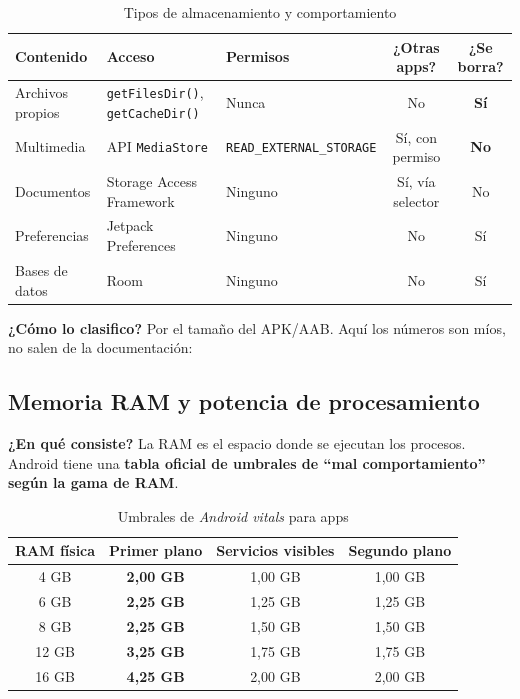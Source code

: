 \documentclass[11pt,a4paper]{article}
\newcommand{\code}[1]{\texttt{\color{ink}#1}}
\newcommand{\campo}[1]{\textbf{\color{ink}#1}}
\begin{document}
	\begin{table}[htbp]
		\centering
		\footnotesize
		\begin{tabularx}{\textwidth}{@{}>{\RaggedRight\arraybackslash}p{2.8cm} >{\RaggedRight\arraybackslash}p{3cm} >{\RaggedRight\arraybackslash}p{3cm} c c@{}}
			\toprule
			\rowcolor{primary}
			\textcolor{paper}{\sffamily\bfseries Contenido} & \textcolor{paper}{\sffamily\bfseries Acceso} & \textcolor{paper}{\sffamily\bfseries Permisos} & \textcolor{paper}{\sffamily\bfseries ¿Otras apps?} & \textcolor{paper}{\sffamily\bfseries ¿Se borra?} \\
			\midrule
			Archivos propios & \code{getFilesDir()}, \code{getCacheDir()} & Nunca & No & \textbf{Sí} \\
			\rowcolor{soft}
			Multimedia & API \code{MediaStore} & \code{READ\_EXTERNAL\_STORAGE} & Sí, con permiso & \textbf{No} \\
			Documentos & Storage Access Framework & Ninguno & Sí, vía selector & No \\
			\rowcolor{soft}
			Preferencias & Jetpack Preferences & Ninguno & No & Sí \\
			Bases de datos & Room & Ninguno & No & Sí \\
			\bottomrule
		\end{tabularx}
		\caption{Tipos de almacenamiento y comportamiento}
	\end{table}
	
	\campo{¿Cómo lo clasifico?} Por el tamaño del APK/AAB. Aquí los números son míos, no salen de la documentación:
	
	\subsection{Memoria RAM y potencia de procesamiento}
	
	\campo{¿En qué consiste?}
	La RAM es el espacio donde se ejecutan los procesos. Android tiene una \textbf{tabla oficial de umbrales de \enquote{mal comportamiento} según la gama de RAM}.
	
	\begin{table}[htbp]
		\centering
		\small
		\begin{tabular}{@{}c c c c@{}}
			\toprule
			\rowcolor{primary}
			\textcolor{paper}{\sffamily\bfseries RAM física} & \textcolor{paper}{\sffamily\bfseries Primer plano} & \textcolor{paper}{\sffamily\bfseries Servicios visibles} & \textcolor{paper}{\sffamily\bfseries Segundo plano} \\
			\midrule
			4 GB & \textbf{2,00 GB} & 1,00 GB & 1,00 GB \\
			\rowcolor{soft}
			6 GB & \textbf{2,25 GB} & 1,25 GB & 1,25 GB \\
			8 GB & \textbf{2,25 GB} & 1,50 GB & 1,50 GB \\
			\rowcolor{soft}
			12 GB & \textbf{3,25 GB} & 1,75 GB & 1,75 GB \\
			16 GB & \textbf{4,25 GB} & 2,00 GB & 2,00 GB \\
			\bottomrule
		\end{tabular}
		\caption{Umbrales de \emph{Android vitals} para apps}
	\end{table}
	
\end{document}
